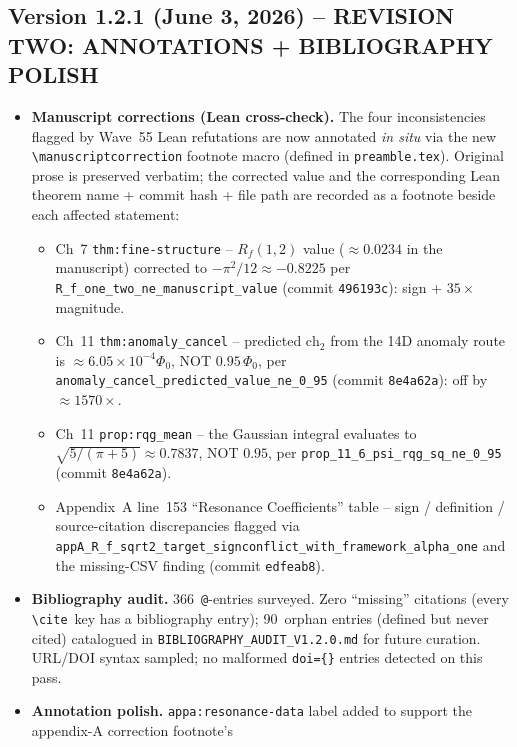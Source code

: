 \subsection*{Version 1.2.1 (June 3, 2026) -- REVISION TWO: ANNOTATIONS + BIBLIOGRAPHY POLISH}
\begin{itemize}
\item \textbf{Manuscript corrections (Lean cross-check).} The four
inconsistencies flagged by Wave~55 Lean refutations are now annotated
\emph{in situ} via the new \texttt{\textbackslash manuscriptcorrection}
footnote macro (defined in \texttt{preamble.tex}). Original prose is
preserved verbatim; the corrected value and the corresponding Lean
theorem name + commit hash + file path are recorded as a footnote
beside each affected statement:
  \begin{itemize}
  \item Ch~7 \texttt{thm:fine-structure} -- $R_f(1,2)$ value
  ($\approx 0.0234$ in the manuscript) corrected to
  $-\pi^2/12\approx -0.8225$ per
  \texttt{R\_f\_one\_two\_ne\_manuscript\_value}
  (commit \texttt{496193c}): sign + $35\times$ magnitude.
  \item Ch~11 \texttt{thm:anomaly\_cancel} -- predicted
  $\text{ch}_2$ from the 14D anomaly route is
  $\approx 6.05\times 10^{-4}\Phi_0$, NOT $0.95\,\Phi_0$, per
  \texttt{anomaly\_cancel\_predicted\_value\_ne\_0\_95}
  (commit \texttt{8e4a62a}): off by $\approx 1570\times$.
  \item Ch~11 \texttt{prop:rqg\_mean} -- the Gaussian integral
  evaluates to $\sqrt{5/(\pi+5)}\approx 0.7837$, NOT $0.95$, per
  \texttt{prop\_11\_6\_psi\_rqg\_sq\_ne\_0\_95}
  (commit \texttt{8e4a62a}).
  \item Appendix~A line~153 ``Resonance Coefficients'' table --
  sign / definition / source-citation discrepancies flagged via
  \texttt{appA\_R\_f\_sqrt2\_target\_signconflict\_with\_framework\_alpha\_one}
  and the missing-CSV finding (commit \texttt{edfeab8}).
  \end{itemize}
\item \textbf{Bibliography audit.} 366~\texttt{@}-entries surveyed.
Zero ``missing'' citations (every \texttt{\textbackslash cite}~key
has a bibliography entry); 90~orphan entries (defined but never
cited) catalogued in \texttt{BIBLIOGRAPHY\_AUDIT\_V1.2.0.md} for
future curation. URL/DOI syntax sampled; no malformed
\texttt{doi=\{\}} entries detected on this pass.
\item \textbf{Annotation polish.} \texttt{appa:resonance-data}
label added to support the appendix-A correction footnote's

\end{itemize}
